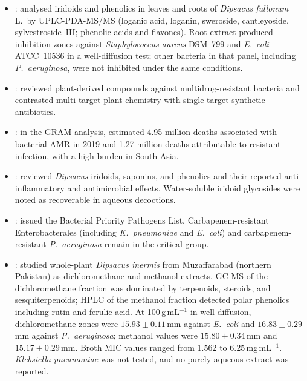 \begin{itemize}
\item \citet{oszmianski2020}: analysed iridoids and phenolics in leaves and roots of \textit{Dipsacus fullonum} L.\ by UPLC-PDA-MS/MS (loganic acid, loganin, sweroside, cantleyoside, sylvestroside~III; phenolic acids and flavones). Root extract produced inhibition zones against \textit{Staphylococcus aureus} DSM~799 and \textit{E.\ coli} ATCC~10536 in a well-diffusion test; other bacteria in that panel, including \textit{P.\ aeruginosa}, were not inhibited under the same conditions.

\item \citet{jubair2021}: reviewed plant-derived compounds against multidrug-resistant bacteria and contrasted multi-target plant chemistry with single-target synthetic antibiotics.

\item \citet{amrcollaborators2022}: in the GRAM analysis, estimated 4.95 million deaths associated with bacterial AMR in 2019 and 1.27 million deaths attributable to resistant infection, with a high burden in South Asia.

\item \citet{skala2023}: reviewed \textit{Dipsacus} iridoids, saponins, and phenolics and their reported anti-inflammatory and antimicrobial effects. Water-soluble iridoid glycosides were noted as recoverable in aqueous decoctions.

\item \citet{who2024}: issued the Bacterial Priority Pathogens List. Carbapenem-resistant Enterobacterales (including \textit{K.\ pneumoniae} and \textit{E.\ coli}) and carbapenem-resistant \textit{P.\ aeruginosa} remain in the critical group.

\item \citet{drakhshaan2026}: studied whole-plant \textit{Dipsacus inermis} from Muzaffarabad (northern Pakistan) as dichloromethane and methanol extracts. GC-MS of the dichloromethane fraction was dominated by terpenoids, steroids, and sesquiterpenoids; HPLC of the methanol fraction detected polar phenolics including rutin and ferulic acid. At 100\,\textmu g\,mL$^{-1}$ in well diffusion, dichloromethane zones were $15.93 \pm 0.11$\,mm against \textit{E.\ coli} and $16.83 \pm 0.29$\,mm against \textit{P.\ aeruginosa}; methanol values were $15.80 \pm 0.34$\,mm and $15.17 \pm 0.29$\,mm. Broth MIC values ranged from 1.562 to 6.25\,mg\,mL$^{-1}$. \textit{Klebsiella pneumoniae} was not tested, and no purely aqueous extract was reported.

\end{itemize}

